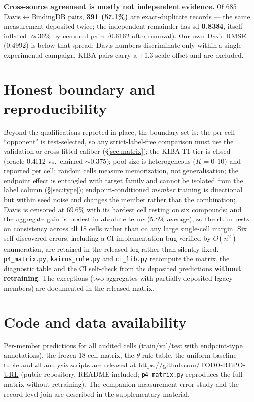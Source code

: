 \documentclass[10pt,letterpaper]{article}
\begin{document}
\textbf{Cross-source agreement is mostly not independent evidence.} Of 685
Davis$\leftrightarrow$BindingDB pairs, \textbf{391 (57.1\%)} are exact-duplicate
records --- the same measurement deposited twice; the independent remainder has sd
\textbf{0.8384}, itself inflated $\approx$36\% by censored pairs (0.6162 after
removal). Our own Davis RMSE (0.4992) is below that spread: Davis numbers discriminate
only within a single experimental campaign. KIBA pairs carry a $+6.3$ scale offset
and are excluded.

\section{Honest boundary and reproducibility}
\label{sec:boundary}

Beyond the qualifications reported in place, the boundary set is: the per-cell
``opponent'' is test-selected, so any strict-label-free comparison must use the
validation or cross-fitted caliber (\S\ref{sec:matrix}); the KIBA T1 tier is closed
(oracle 0.4112 vs.\ claimed $\sim$0.375); pool size is heterogeneous ($K = 0$--$10$)
and reported per cell; random cells measure memorization, not generalisation; the
endpoint effect is entangled with target family and cannot be isolated from the label
column (\S\ref{sec:type}); endpoint-conditioned \emph{member} training is directional
but within seed noise and changes the member rather than the combination; Davis is
censored at 69.6\% with its hardest cell resting on six compounds; and the aggregate
gain is modest in absolute terms (5.8\% average), so the claim rests on consistency
across all 18 cells rather than on any large single-cell margin. Six self-discovered
errors, including a CI
implementation bug verified by $O(n^2)$ enumeration, are retained in the released log
rather than silently fixed. \texttt{p4\_matrix.py}, \texttt{kairos\_rule.py} and
\texttt{ci\_lib.py} recompute the matrix, the diagnostic table and the CI self-check
from the deposited predictions \textbf{without retraining}. The exceptions (two
aggregates with partially deposited legacy members) are documented in the released
matrix.

\section*{Code and data availability}

Per-member predictions for all audited cells (train/val/test with endpoint-type
annotations), the frozen 18-cell matrix, the $\theta$-rule table, the
uniform-baseline table and all analysis scripts are released at
\url{https://github.com/TODO-REPO-URL} (public repository, README included;
\texttt{p4\_matrix.py} reproduces the full matrix without retraining). The companion
measurement-error study and the record-level join are described in the supplementary
material.
\end{document}
